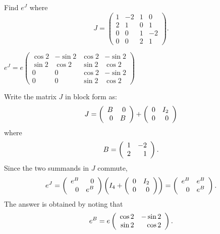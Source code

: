 \documentclass{ximera}
\begin{document}
\begin{exercise} \label{c11.1.3C}
Find $e^J$ where 
\[
J = \left(\begin{array}{rrrr} 
1 & -2 & 1 &  0 \\ 
2 &  1 & 0 &  1 \\
0 &  0 & 1 & -2 \\
0 &  0 & 2 &  1
\end{array}\right).
\]

\begin{solution}
\ans $e^J = e\left(\begin{array}{rrrr}
  \cos 2 & -\sin 2 & \cos 2 & -\sin 2\\
  \sin 2 &  \cos 2 & \sin 2 &  \cos 2\\
     0   &    0    &  \cos 2 &  -\sin 2\\
     0   &    0    &  \sin 2 &   \cos 2  
\end{array}\right)$

\soln Write the matrix $J$ in block form as:
\[
J = \left(\begin{array}{rr} B & 0\\ 0 &B\end{array}\right) + \left(\begin{array}{rr} 0 & I_2\\ 0 &0\end{array}\right)
\]
where 
\[
B = \left(\begin{array}{rr} 1 & -2\\ 2 &1\end{array}\right).
\]
Since the two summands in $J$ commute, 
\[
e^J = \left(\begin{array}{rr} e^B & 0\\ 0 &e^B\end{array}\right)\left(I_4 + \left(\begin{array}{rr} 0 & I_2\\ 0 &0\end{array}\right)\right)
= \left(\begin{array}{rr} e^B & e^B\\ 0 &e^B\end{array}\right).
\]
The answer is obtained by noting that 
\[
e^B = e\left(\begin{array}{rr} \cos 2 & -\sin 2\\ \sin 2 &\cos 2\end{array}\right).
\]


\end{solution}
\end{exercise}
\end{document}
